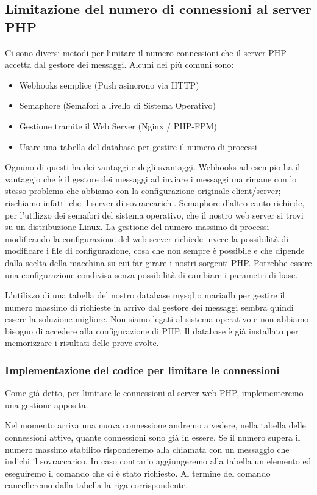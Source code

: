 \subsection{Limitazione del numero di connessioni al server PHP}
Ci sono diversi metodi per limitare il numero connessioni che il server PHP accetta dal gestore dei messaggi. Alcuni dei pi\`u comuni sono:
\begin{itemize}
    \item Webhooks semplice (Push asincrono via HTTP)
    \item Semaphore (Semafori a livello di Sistema Operativo) 
    \item Gestione tramite il Web Server (Nginx / PHP-FPM)
    \item Usare una tabella del database per gestire il numero di processi
\end{itemize}

Ognuno di questi ha dei vantaggi e degli svantaggi. Webhooks ad esempio ha il vantaggio che \`e il gestore dei messaggi ad inviare i messaggi ma rimane con lo stesso problema che abbiamo con la configurazione originale client/server; rischiamo infatti che il server di sovraccarichi.
Semaphore d'altro canto richiede, per l'utilizzo dei semafori del sistema operativo, che il nostro web server si trovi su un distribuzione Linux.
La gestione del numero massimo di processi modificando la configurazione del web server richiede invece la possibilit\`a di modificare i file di configurazione, cosa che non sempre \`e possibile e che dipende dalla scelta della macchina su cui far girare i nostri sorgenti PHP. Potrebbe essere una configurazione condivisa senza possibilit\`a di cambiare i parametri di base.

L'utilizzo di una tabella del nostro database mysql o mariadb per gestire il numero massimo di richieste in arrivo dal gestore dei messaggi sembra quindi essere la soluzione migliore.
Non siamo legati al sistema operativo e non abbiamo bisogno di accedere alla configurazione di PHP. Il database \`e gi\`a installato per memorizzare i risultati delle prove svolte.

\subsubsection{Implementazione del codice per limitare le connessioni}
Come gi\`a detto, per limitare le connessioni al server web PHP, implementeremo una gestione apposita. 

Nel momento arriva una nuova connessione andremo a vedere, nella tabella delle connessioni attive, quante connessioni sono gi\`a in essere. Se il numero supera il numero massimo stabilito risponderemo alla chiamata con un messaggio che indichi il sovraccarico. In caso contrario aggiungeremo alla tabella un elemento ed eseguiremo il comando che ci \`e stato richiesto. Al termine del comando cancelleremo dalla tabella la riga corrispondente.

